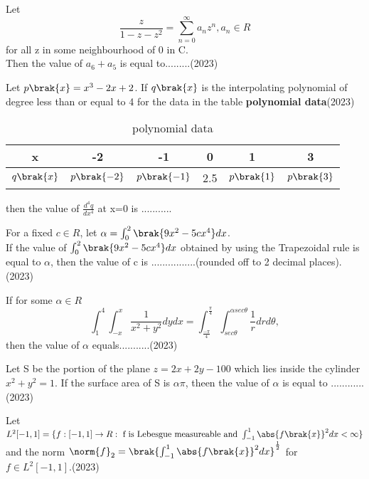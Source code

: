 
\iffalse
\chapter{2023}
\author{AI24BTECH11008}
\section{ma}
\fi

\item Let $$\frac{z}{1-z-z^2} = \sum_{n=0}^{\infty}a_nz^n, a_n \in R$$ for all z in some neighbourhood of 0 in C.\\ Then the value of $a_6+a_5$ is equal to.........\hfill (2023)
    \item Let $p\brak{x}=x^3-2x+2$. If $q\brak{x}$ is the interpolating polynomial of degree less than or equal to 4 for the data in the table \textbf{polynomial data}\hfill (2023)\\
    \begin{table}
        \centering
        \begin{tabular}{|c|c|c|c|c|c|}
            \hline
            x & -2&-1&0&1&3\\ \hline
            $q\brak{x}$&$p\brak{-2}$&$p\brak{-1}$&2.5&$p\brak{1}$&$p\brak{3}$\\ \hline
        \end{tabular} %
        \caption{polynomial data}
    \end{table}
    then the value of $\frac{d^4q}{dx^4}$ at x=0 is ...........
    \item For a fixed $c \in R$, let $\alpha = \int_{0}^{2}\brak{9x^2-5cx^4}dx$.\\ If the value of $\int_{0}^{2}\brak{9x^2-5cx^4}dx$ obtained by using the Trapezoidal rule is equal to $\alpha$, then the value of c is ................(rounded off to 2 decimal places).\hfill (2023)
    \item If for some $\alpha \in R$ $$\int_{1}^{4}\int_{-x}^{x}\frac{1}{x^2+y^2}dydx = \int_{\frac{-\pi}{4}}^{\frac{\pi}{4}}\int_{sec\theta}^{\alpha sec\theta}\frac{1}{r}drd\theta,$$ then the value of $\alpha$ equals...........\hfill (2023)
    \item Let S be the portion of the plane $z=2x+2y-100$ which lies inside the cylinder $x^2+y^2=1$. If the surface area of S is $\alpha\pi$, theen the value of $\alpha$ is equal to ............ \hfill (2023)
    \item Let $L^2[-1,1] = \{f:[-1,1]\to R:\text{ f is Lebesgue measureable and }\int_{-1}^{1}\abs{f\brak{x}}^2dx<\infty\}$ and the norm $\norm{f}_2=\brak{\int_{-1}^{1}\abs{f\brak{x}}^2dx}^{\frac{1}{2}}$ for $f\in L^2[-1,1]$.\hfill (2023)\\
